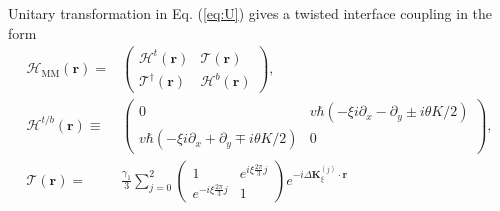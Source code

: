 \documentclass[showpacs,aps,prb,reprint,twocolumn]{revtex4-1}
\begin{document}
Unitary transformation in Eq. (\ref{eq:U}) gives a twisted interface coupling in the form \cite{Lopes_2007, Bistritzer_2011, Lopes_2012, Koshino_2015}
\begin{align}
\mathcal{H}_{\mathrm{MM}}(\boldsymbol{r})=&
\left(
\begin{matrix}
\mathcal{H}^t(\boldsymbol{r})&
\mathcal{T}(\boldsymbol{r})\\
\mathcal{T}^{\dagger}(\boldsymbol{r})&
\mathcal{H}^b(\boldsymbol{r})
\end{matrix}
\right),\\
\mathcal{H}^{t/b}(\boldsymbol{r})\equiv&
\left(
\begin{matrix}
0&v\hbar(-\xi i\partial_x-\partial_y\pm i\theta K/2)\\
v\hbar(-\xi i\partial_x+\partial_y\mp i\theta K/2)&0
\end{matrix}
\right),\nonumber\\
\mathcal{T}(\boldsymbol{r})
=&\frac{\gamma_1}{3}
\!\sum_{j=0}^2
\left(
\begin{matrix}
1&e^{i\xi\frac{2\pi}{3}j}\\
e^{-i\xi\frac{2\pi}{3}j}&1
\end{matrix}
\right)e^{-i\Delta\boldsymbol{K}_\xi^{(j)}\cdot\boldsymbol{r}}\nonumber
\end{align}
\end{document}
